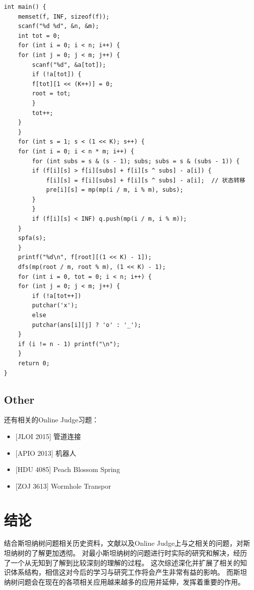 \documentclass{SCIS2022cn}
\begin{document}
\begin{lstlisting}
int main() {
    memset(f, INF, sizeof(f));
    scanf("%d %d", &n, &m);
    int tot = 0;
    for (int i = 0; i < n; i++) {
    for (int j = 0; j < m; j++) {
        scanf("%d", &a[tot]);
        if (!a[tot]) {
        f[tot][1 << (K++)] = 0;
        root = tot;
        }
        tot++;
    }
    }
    for (int s = 1; s < (1 << K); s++) {
    for (int i = 0; i < n * m; i++) {
        for (int subs = s & (s - 1); subs; subs = s & (subs - 1)) {
        if (f[i][s] > f[i][subs] + f[i][s ^ subs] - a[i]) {
            f[i][s] = f[i][subs] + f[i][s ^ subs] - a[i];  // 状态转移
            pre[i][s] = mp(mp(i / m, i % m), subs);
        }
        }
        if (f[i][s] < INF) q.push(mp(i / m, i % m));
    }
    spfa(s);
    }
    printf("%d\n", f[root][(1 << K) - 1]);
    dfs(mp(root / m, root % m), (1 << K) - 1);
    for (int i = 0, tot = 0; i < n; i++) {
    for (int j = 0; j < m; j++) {
        if (!a[tot++])
        putchar('x');
        else
        putchar(ans[i][j] ? 'o' : '_');
    }
    if (i != n - 1) printf("\n");
    }
    return 0;
}
\end{lstlisting}

\subsection{Other}

还有相关的Online Judge习题：

\begin{itemize}
    \item {[JLOI 2015]} 管道连接
    \item {[APIO 2013]} 机器人
    \item {[HDU 4085]} Peach Blossom Spring
    \item {[ZOJ 3613]} Wormhole Transpor
\end{itemize}

\section{结论}

结合斯坦纳树问题相关历史资料，文献以及Online Judge上与之相关的问题，对斯坦纳树的了解更加透彻。
对最小斯坦纳树的问题进行时实际的研究和解决，经历了一个从无知到了解到比较深刻的理解的过程。
这次综述深化并扩展了相关的知识体系结构，相信这对今后的学习与研究工作将会产生非常有益的影响。
而斯坦纳树问题会在现在的各项相关应用越来越多的应用并延伸，发挥着重要的作用。

\end{document}
